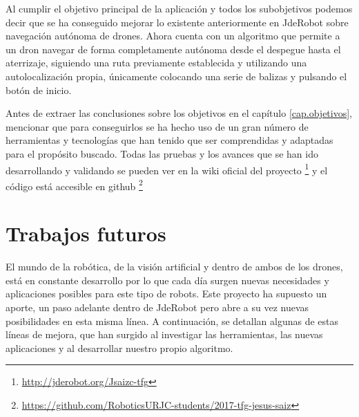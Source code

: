 \hspace{1cm} Al cumplir el objetivo principal de la aplicación y todos los subobjetivos podemos decir que se ha conseguido mejorar lo existente anteriormente en JdeRobot sobre navegación autónoma de drones. Ahora cuenta con un algoritmo que permite a un dron navegar de forma completamente autónoma desde el despegue hasta el aterrizaje, siguiendo una ruta previamente establecida y utilizando una autolocalización propia, únicamente colocando una serie de balizas y pulsando el botón de inicio.

\hspace{1cm} Antes de extraer las conclusiones sobre los objetivos en el capítulo \ref{cap.objetivos}, mencionar que para conseguirlos se ha hecho uso de un gran número de herramientas y tecnologías que han tenido que ser comprendidas y adaptadas para el propósito buscado. Todas las pruebas y los avances que se han ido desarrollando y validando se pueden ver en la wiki oficial del proyecto \footnote{\url{http://jderobot.org/Jsaizc-tfg}} y el código está accesible en github \footnote{\url{https://github.com/RoboticsURJC-students/2017-tfg-jesus-saiz}} 

\section{Trabajos futuros}
\hspace{1cm} El mundo de la robótica, de la visión artificial y dentro de ambos de los drones, está en constante desarrollo por lo que cada día surgen nuevas necesidades y aplicaciones posibles para este tipo de robots. Este proyecto ha supuesto un aporte, un paso adelante dentro de JdeRobot pero abre a su vez nuevas posibilidades en esta misma línea. A continuación, se detallan algunas de estas líneas de mejora, que han surgido al investigar las herramientas, las nuevas aplicaciones y al desarrollar nuestro propio algoritmo.

